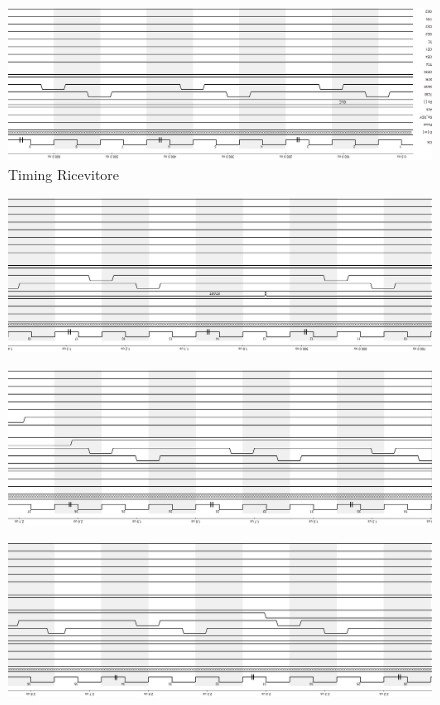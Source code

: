 \documentclass[a4paper, titlepage]{article}
\begin{document}
\begin{figure}
\centering
\includegraphics[scale=0.6]{RX_timing_pt1.png} 
\caption{Timing Ricevitore}
\label{RX Timing}
\end{figure}
\begin{figure}
\centering
\includegraphics[scale=0.6]{RX_timing_pt2.png} 
\end{figure}
\begin{figure}
\centering
\includegraphics[scale=0.6]{RX_timing_pt3.png} 
\end{figure}
\begin{figure}
\centering
\includegraphics[scale=0.6]{RX_timing_pt4.png} 
\end{figure}
\end{document}
